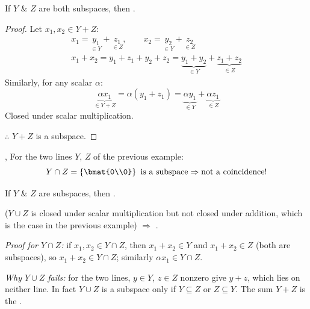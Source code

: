 \begin{remark}
If $Y$ \& $Z$ are both subspaces, then .
\end{remark}
\begin{proof}
Let $x_1, x_2\in Y+Z$:
\begin{gather*}
x_1 = \underset{\in Y}{y_1}+\underset{\in Z}{z_1}, \qquad x_2 = \underset{\in Y}{y_2}+\underset{\in Z}{z_2}\\[6pt]
x_1+x_2 = y_1+z_1+y_2+z_2 = \underbrace{y_1+y_2}_{\in Y}+\underbrace{z_1+z_2}_{\in Z}
\end{gather*}
Similarly, for any scalar $\alpha$:
\[
\underbrace{\alpha x_1}_{\in Y+Z} = \alpha(y_1+z_1) = \underbrace{\alpha y_1}_{\in Y}+\underbrace{\alpha z_1}_{\in Z}
\]
Closed under scalar multiplication.

$\therefore$ $Y+Z$ is a subspace.
\end{proof}

\sep
For the two lines $Y$, $Z$ of the previous example:
\[ Y\cap Z = \left\{\bmat{0\\0}\right\} \text{ is a subspace} \Rightarrow \text{not a coincidence!} \]

\begin{remark}
If $Y$ \& $Z$ are subspaces, then .

($Y\cup Z$ is closed under scalar multiplication but not closed under addition, which is the case in the previous example) $\Rightarrow$ .
\end{remark}
\begin{insight}
\emph{Proof for $Y\cap Z$:} if $x_1,x_2\in Y\cap Z$, then $x_1+x_2\in Y$ and $x_1+x_2\in Z$ (both are subspaces), so $x_1+x_2\in Y\cap Z$; similarly $\alpha x_1\in Y\cap Z$.

\emph{Why $Y\cup Z$ fails:} for the two lines, $y\in Y$, $z\in Z$ nonzero give $y+z$, which lies on neither line. In fact $Y\cup Z$ is a subspace only if $Y\subseteq Z$ or $Z\subseteq Y$. The sum $Y+Z$ is the .
\end{insight}

